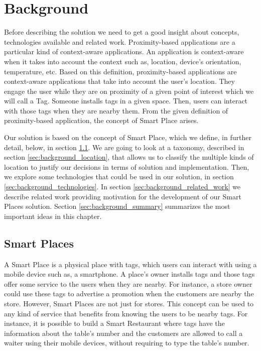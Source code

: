 
\chapter{Background}
\label{chapter:background}
Before describing the solution we need to get a good insight about concepts, technologies available and related work.
Proximity-based applications are a particular kind of context-aware applications.
An application is context-aware when it takes into account the context such as, location, device's orientation, temperature, etc.
Based on this definition, proximity-based applications are context-aware applications that take into account the user's location.
They engage the user while they are on proximity of a given point of interest which we will call a Tag.
Someone installs tags in a given space.
Then, users can interact with those tags when they are nearby them.
From the given definition of proximity-based application, the concept of Smart Place arises.

Our solution is based on the concept of Smart Place, which we define, in further detail, below, in section \ref{sec:background_smart_places}.
We are going to look at a taxonomy, described in section \ref{sec:background_location}, that allows us to classify the multiple kinds of location to justify our decisions in terms of solution and implementation.
Then, we explore some technologies that could be used in our solution, in section \ref{sec:background_technologies}.
In section \ref{sec:background_related_work} we describe related work providing motivation for the development of our Smart Places solution.
Section \ref{sec:background_summary} summarizes the most important ideas in this chapter.

\section{Smart Places}
\label{sec:background_smart_places}
A Smart Place is a physical place with tags, which users can interact with using a mobile device such as, a smartphone.
A place's owner installs tags and those tags offer some service to the users when they are nearby.
For instance, a store owner could use these tags to advertise a promotion when the customers are nearby the store.
However, Smart Places are not just for stores.
This concept can be used to any kind of service that benefits from knowing the users to be nearby tags.
For instance, it is possible to build a Smart Restaurant where tags have the information about the table's number and the customers are allowed to call a waiter using their mobile devices, without requiring to type the table's number.

